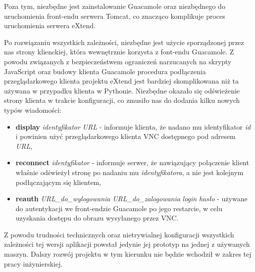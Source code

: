   Poza tym, niezbędne jest zainstalowanie Guacamole oraz niezbędnego do uruchomienia front-endu serwera Tomcat, co znacząco komplikuje proces uruchomienia serwera eXtend.

  Po rozwiązaniu wszystkich zależności, niezbędne jest użycie sporządzonej przez nas strony klienckiej, która wewnętrznie korzysta z font-endu Guacamole. Z powodu związanych z bezpieczeństwem ograniczeń narzucanych na skrypty JavaScript oraz budowy klienta Guacamole procedura podłączenia przeglądarkowego klienta projektu eXtend jest bardziej skomplikowana niż ta używana w przypadku klienta w Pythonie. Niezbędne okazało się odświeżenie strony klienta w trakcie konfiguracji, co zmusiło nas do dodania kilku nowych typów wiadomości:

  \begin{itemize}
    \item \textbf{display} \emph{identyfikator} \emph{URL} - informuje klienta, że nadano mu identyfikator \emph{id} i powinien użyć przeglądarkowego klienta VNC dostępnego pod adresem \emph{URL},
    \item \textbf{reconnect} \emph{identyfikator} - informuje serwer, że nawiązujący połączenie klient właśnie odświeżył stronę po nadaniu mu \emph{identyfikatora}, a nie jest kolejnym podłączającym się klientem,
    \item \textbf{reauth} \emph{URL\_do\_wylogowania} \emph{URL\_do\_zalogowania} \emph{login} \emph{hasło} - używane do autentykacji we front-endzie Guacamole po jego restarcie, w celu uzyskania dostępu do obrazu wysyłanego przez VNC.
  \end{itemize}


  Z powodu trudności technicznych oraz nietrywialnej konfiguracji wszystkich zależności tej wersji aplikacji powstał jedynie jej prototyp na jednej z używanych maszyn. Dalszy rozwój projektu w tym kierunku nie będzie wchodził w zakres tej pracy inżynierskiej.


